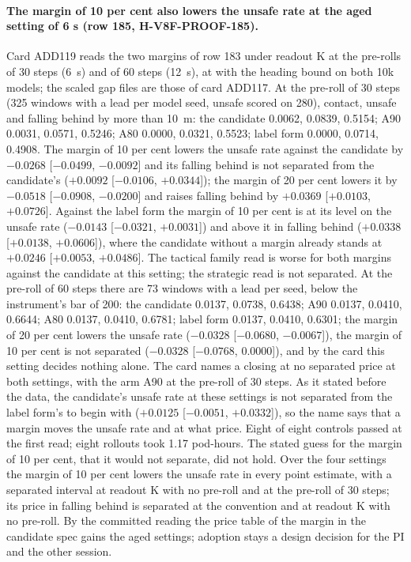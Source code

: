 \paragraph{The margin of 10 per cent also lowers the unsafe rate at the aged setting of 6 s (row 185, H-V8F-PROOF-185).} Card ADD119 reads the two margins of row 183 under readout K at the pre-rolls of 30 steps (6~s) and of 60 steps (12~s), at  with the heading bound on both 10k models; the scaled gap files are those of card ADD117. At the pre-roll of 30 steps (325 windows with a lead per model seed, unsafe scored on 280), contact, unsafe and falling behind by more than 10~m: the candidate 0.0062, 0.0839, 0.5154; A90 0.0031, 0.0571, 0.5246; A80 0.0000, 0.0321, 0.5523; label form 0.0000, 0.0714, 0.4908. The margin of 10 per cent lowers the unsafe rate against the candidate by $-0.0268$ [$-0.0499$, $-0.0092$] and its falling behind is not separated from the candidate's ($+0.0092$ [$-0.0106$, $+0.0344$]); the margin of 20 per cent lowers it by $-0.0518$ [$-0.0908$, $-0.0200$] and raises falling behind by $+0.0369$ [$+0.0103$, $+0.0726$]. Against the label form the margin of 10 per cent is at its level on the unsafe rate ($-0.0143$ [$-0.0321$, $+0.0031$]) and above it in falling behind ($+0.0338$ [$+0.0138$, $+0.0606$]), where the candidate without a margin already stands at $+0.0246$ [$+0.0053$, $+0.0486$]. The tactical family read is worse for both margins against the candidate at this setting; the strategic read is not separated. At the pre-roll of 60 steps there are 73 windows with a lead per seed, below the instrument's bar of 200: the candidate 0.0137, 0.0738, 0.6438; A90 0.0137, 0.0410, 0.6644; A80 0.0137, 0.0410, 0.6781; label form 0.0137, 0.0410, 0.6301; the margin of 20 per cent lowers the unsafe rate ($-0.0328$ [$-0.0680$, $-0.0067$]), the margin of 10 per cent is not separated ($-0.0328$ [$-0.0768$, 0.0000]), and by the card this setting decides nothing alone. The card names a closing at no separated price at both settings, with the arm A90 at the pre-roll of 30 steps. As it stated before the data, the candidate's unsafe rate at these settings is not separated from the label form's to begin with ($+0.0125$ [$-0.0051$, $+0.0332$]), so the name says that a margin moves the unsafe rate and at what price. Eight of eight controls passed at the first read; eight rollouts took 1.17 pod-hours. The stated guess for the margin of 10 per cent, that it would not separate, did not hold. Over the four settings the margin of 10 per cent lowers the unsafe rate in every point estimate, with a separated interval at readout K with no pre-roll and at the pre-roll of 30 steps; its price in falling behind is separated at the convention and at readout K with no pre-roll. By the committed reading the price table of the margin in the candidate spec gains the aged settings; adoption stays a design decision for the PI and the other session.


